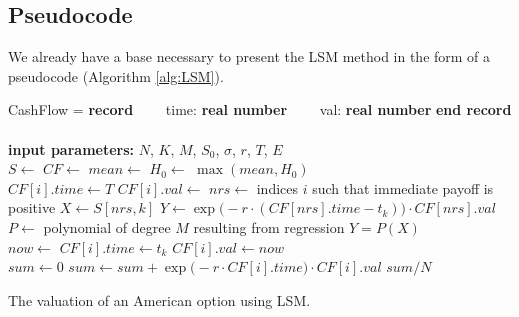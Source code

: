 \documentclass[a4paper,11pt, twoside]{book}
\theoremstyle{definition}
\theoremstyle{remark}
\begin{document}
\subsection{Pseudocode}
We already have a base necessary to present the LSM method in the form of a pseudocode (Algorithm \ref{alg:LSM}).

\begin{algorithm}
 \begin{algorithmic}[1]
  \State CashFlow = \textbf{record}
    \State\ \ \ \ time: \textbf{real number}
    \State\ \ \ \ val: \textbf{real number}
  \State \textbf{end record} \\
  \\
  \textbf{input parameters:} $N$, $K$, $M$, $S_0$, $\sigma$, $r$, $T$, $E$
  \\
    \State $S \gets $ 
    \State $CF \gets$ 
    \State $mean \gets$ 
    \State $H_0 \gets$ 
    \State \Return $\max(mean, H_0)$
  \EndFunction \\
  
      \State $CF[i].time \gets T$
      \State $CF[i].val \gets $ 
    \EndFor
      \State $nrs \gets $ indices $i$ such that immediate payoff is positive
      \State $X \gets S[nrs, k]$
      \State $Y \gets \exp\bigl(-r\cdot(CF[nrs].time-t_k) \bigr)\cdot CF[nrs].val$
      \State $P \gets $ polynomial of degree $M$ resulting from regression $Y = P(X)$
      \State {}
    \EndFor
  \EndFunction \\
  
      \State $now \gets$ 
	\State $CF[i].time \gets t_k$ 
	\State $CF[i].val \gets now$ 
      \EndIf
    \EndFor
  \EndFunction \\
  
    \State $sum \gets 0$
      \State $sum \gets sum + \exp\bigl(-r\cdot CF[i].time \bigr) \cdot CF[i].val$
    \EndFor
    \State \Return $sum/N$
  \EndFunction
 \end{algorithmic}
 \caption{The valuation of an American option using LSM.}
 \label{alg:LSM}
\end{algorithm}
  
\end{document}
